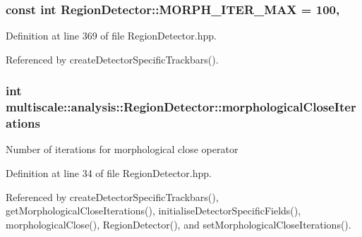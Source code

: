\hypertarget{classmultiscale_1_1analysis_1_1RegionDetector_adeaa40a86b09bad2530bf179cbb4e602}{
\subsubsection[{M\-O\-R\-P\-H\-\_\-\-I\-T\-E\-R\-\_\-\-M\-A\-X}]{\setlength{\rightskip}{0pt plus 5cm}const int Region\-Detector\-::\-M\-O\-R\-P\-H\-\_\-\-I\-T\-E\-R\-\_\-\-M\-A\-X = 100\hspace{0.3cm}{\ttfamily [static]}, {\ttfamily [private]}}}\label{classmultiscale_1_1analysis_1_1RegionDetector_adeaa40a86b09bad2530bf179cbb4e602}


Definition at line 369 of file Region\-Detector.\-hpp.



Referenced by create\-Detector\-Specific\-Trackbars().

\hypertarget{classmultiscale_1_1analysis_1_1RegionDetector_a700a2f299d7c56fbd1fdbec68092f23a}{
\subsubsection[{morphological\-Close\-Iterations}]{\setlength{\rightskip}{0pt plus 5cm}int multiscale\-::analysis\-::\-Region\-Detector\-::morphological\-Close\-Iterations\hspace{0.3cm}{\ttfamily [private]}}}\label{classmultiscale_1_1analysis_1_1RegionDetector_a700a2f299d7c56fbd1fdbec68092f23a}
Number of iterations for morphological close operator 

Definition at line 34 of file Region\-Detector.\-hpp.



Referenced by create\-Detector\-Specific\-Trackbars(), get\-Morphological\-Close\-Iterations(), initialise\-Detector\-Specific\-Fields(), morphological\-Close(), Region\-Detector(), and set\-Morphological\-Close\-Iterations().

